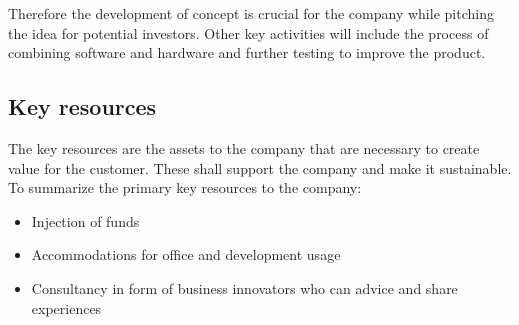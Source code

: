 Therefore the development of concept is crucial for the company while pitching the idea for potential investors. Other key activities will include the process of combining software and hardware and further testing to improve the product. 

\subsection{Key resources}
The key resources are the assets to the company that are necessary to create value for the customer. These shall support the company and make it sustainable.
To summarize the primary key resources to the company:
\begin{itemize}
\item Injection of funds
\item Accommodations for office and development usage
\item Consultancy in form of business innovators who can advice and share experiences
\end{itemize}
